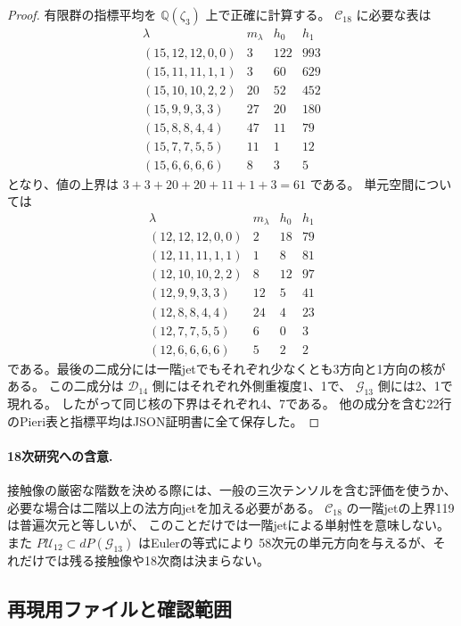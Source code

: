 \begin{proof}
有限群の指標平均を $\mathbb Q(\zeta_3)$ 上で正確に計算する。
$\mathcal C_{18}$ に必要な表は
\[
\begin{array}{c|r|r|r}
\lambda&m_\lambda&h_0&h_1\\\hline
(15,12,12,0,0)&3&122&993\\
(15,11,11,1,1)&3&60&629\\
(15,10,10,2,2)&20&52&452\\
(15,9,9,3,3)&27&20&180\\
(15,8,8,4,4)&47&11&79\\
(15,7,7,5,5)&11&1&12\\
(15,6,6,6,6)&8&3&5
\end{array}
\]
となり、値の上界は $3+3+20+20+11+1+3=61$ である。
単元空間については
\[
\begin{array}{c|r|r|r}
\lambda&m_\lambda&h_0&h_1\\\hline
(12,12,12,0,0)&2&18&79\\
(12,11,11,1,1)&1&8&81\\
(12,10,10,2,2)&8&12&97\\
(12,9,9,3,3)&12&5&41\\
(12,8,8,4,4)&24&4&23\\
(12,7,7,5,5)&6&0&3\\
(12,6,6,6,6)&5&2&2
\end{array}
\]
である。最後の二成分には一階jetでもそれぞれ少なくとも3方向と1方向の核がある。
この二成分は $\mathcal D_{14}$ 側にはそれぞれ外側重複度1、1で、
$\mathcal G_{13}$ 側には2、1で現れる。
したがって同じ核の下界はそれぞれ4、7である。
他の成分を含む22行のPieri表と指標平均はJSON証明書に全て保存した。
\end{proof}

\paragraph{18次研究への含意.}
接触像の厳密な階数を決める際には、一般の三次テンソルを含む評価を使うか、
必要な場合は二階以上の法方向jetを加える必要がある。
$\mathcal C_{18}$ の一階jetの上界119は普遍次元と等しいが、
このことだけでは一階jetによる単射性を意味しない。
また $P\mathcal U_{12}\subset dP(\mathcal G_{13})$ はEulerの等式により
58次元の単元方向を与えるが、それだけでは残る接触像や18次商は決まらない。

\subsection{再現用ファイルと確認範囲}

